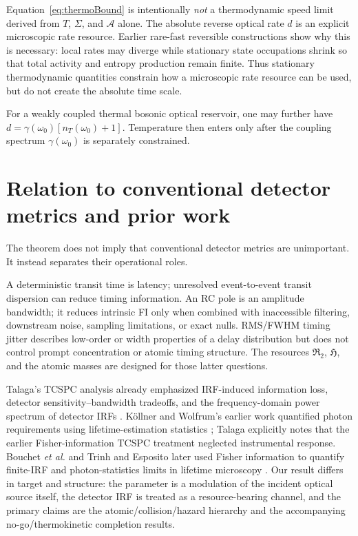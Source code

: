 \documentclass[aps,prapplied,preprint,nofootinbib]{revtex4-2}
\newcommand{\Rtwo}{\mathfrak R_2}
\newcommand{\Hcap}{\mathfrak H}
\begin{document}
Equation~\eqref{eq:thermoBound} is intentionally \emph{not} a thermodynamic speed limit derived from $T$, $\Sigma$, and $\mathcal A$ alone.  The absolute reverse optical rate $d$ is an explicit microscopic rate resource.  Earlier rare-fast reversible constructions show why this is necessary: local rates may diverge while stationary state occupations shrink so that total activity and entropy production remain finite.  Thus stationary thermodynamic quantities constrain how a microscopic rate resource can be used, but do not create the absolute time scale.

For a weakly coupled thermal bosonic optical reservoir, one may further have $d=\gamma(\omega_0)[n_T(\omega_0)+1]$.  Temperature then enters only after the coupling spectrum $\gamma(\omega_0)$ is separately constrained.

\section{Relation to conventional detector metrics and prior work}

The theorem does not imply that conventional detector metrics are unimportant.  It instead separates their operational roles.

A deterministic transit time is latency; unresolved event-to-event transit dispersion can reduce timing information.  An RC pole is an amplitude bandwidth; it reduces intrinsic FI only when combined with inaccessible filtering, downstream noise, sampling limitations, or exact nulls.  RMS/FWHM timing jitter describes low-order or width properties of a delay distribution but does not control prompt concentration or atomic timing structure.  The resources $\Rtwo$, $\Hcap$, and the atomic masses are designed for those latter questions.

Talaga's TCSPC analysis already emphasized IRF-induced information loss, detector sensitivity--bandwidth tradeoffs, and the frequency-domain power spectrum of detector IRFs \cite{Talaga2009}.  K\"ollner and Wolfrum's earlier work quantified photon requirements using lifetime-estimation statistics \cite{KollnerWolfrum1992}; Talaga explicitly notes that the earlier Fisher-information TCSPC treatment neglected instrumental response.  Bouchet \emph{et al.} and Trinh and Esposito later used Fisher information to quantify finite-IRF and photon-statistics limits in lifetime microscopy \cite{Bouchet2019,TrinhEsposito2021}.  Our result differs in target and structure: the parameter is a modulation of the incident optical source itself, the detector IRF is treated as a resource-bearing channel, and the primary claims are the atomic/collision/hazard hierarchy and the accompanying no-go/thermokinetic completion results.
\end{document}
